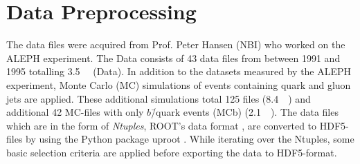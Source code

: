

\section{Data Preprocessing}
\label{sec:q:data_preprocessing}

The data files were acquired from Prof. Peter Hansen (NBI) who worked on the ALEPH experiment. The Data consists of \num{43} data files from between \num{1991} and \num{1995} totalling \SI{3.5}{\giga\byte} (Data). In addition to the datasets measured by the ALEPH experiment, Monte Carlo (MC) simulations of events containing quark and gluon jets are applied. These additional simulations total \num{125} files (\SI{8.4}{\giga\byte}) and additional \num{42} MC-files with only $b$\=/quark events (MCb) (\SI{2.1}{\giga\byte}). The data files which are in the form of \emph{Ntuples}, ROOT's data format \autocite{brunROOTObjectOriented1997}, are converted to HDF5-files by using the Python package uproot \autocite{ScikithepUproot2019}. While iterating over the Ntuples, some basic selection criteria are applied before exporting the data to HDF5-format. 

